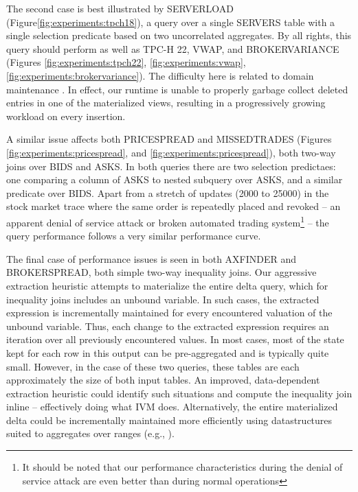 The second case is best illustrated by SERVERLOAD (Figure\ref{fig:experiments:tpch18}), a query over a single SERVERS table with a single selection predicate based on two uncorrelated aggregates.  By all rights, this query should perform as well as TPC-H 22, VWAP, and BROKERVARIANCE (Figures \ref{fig:experiments:tpch22}, \ref{fig:experiments:vwap}, \ref{fig:experiments:brokervariance}).  The difficulty here is related to domain maintenance .  In effect, our runtime is unable to properly garbage collect deleted entries in one of the materialized views, resulting in a progressively growing workload on every insertion.  

A similar issue affects both PRICESPREAD and MISSEDTRADES (Figures \ref{fig:experiments:pricespread}, and \ref{fig:experiments:pricespread}), both two-way joins over BIDS and ASKS.  In both queries there are two selection predictaes: one comparing a column of ASKS to nested subquery over ASKS, and a similar predicate over BIDS.  Apart from a stretch of updates (2000 to 25000) in the stock market trace where the same order is repeatedly placed and revoked -- an apparent denial of service attack or broken automated trading system\footnote{It should be noted that our performance characteristics during the denial of service attack are even better than during normal operations} -- the query performance follows a very similar performance curve. 

The final case of performance issues is seen in both AXFINDER and BROKERSPREAD, both simple two-way inequality joins.  Our aggressive extraction heuristic attempts to materialize the entire delta query, which for inequality joins includes an unbound variable.  In such cases, the extracted expression is incrementally maintained for every encountered valuation of the unbound variable.  Thus, each change to the extracted expression requires an iteration over all previously encountered values.  In most cases, most of the state kept for each row in this output can be pre-aggregated and is typically quite small.  However, in the case of these two queries, these tables are each approximately the size of both input tables.  An improved, data-dependent extraction heuristic could identify such situations and compute the inequality join inline -- effectively doing what IVM does.  Alternatively, the entire materialized delta could be incrementally maintained more efficiently using datastructures suited to aggregates over ranges (e.g., \cite{range trees}).


